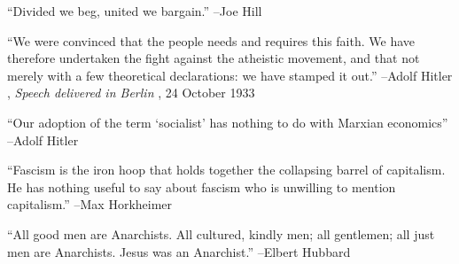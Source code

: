 \documentclass{article}%
\begin{document}
\linebreak%
\vspace{1mm}%
\begin{minipage}{\textwidth}%
\flushleft%
“Divided we beg, united we bargain.”%
\linebreak%
\vspace{1mm}%
–Joe Hill%
\linebreak%
\vspace{1mm}%
\end{minipage}%
\linebreak%
\vspace{1mm}%
\begin{minipage}{\textwidth}%
\flushleft%
“We were convinced that the people needs and requires this faith. We have therefore undertaken the fight against the atheistic movement, and that not merely with a few theoretical declarations: we have stamped it out.”%
\linebreak%
\vspace{1mm}%
–Adolf Hitler%
, \textit{Speech delivered in Berlin}%
, 24 October 1933%
\linebreak%
\vspace{1mm}%
\end{minipage}%
\linebreak%
\vspace{1mm}%
\begin{minipage}{\textwidth}%
\flushleft%
“Our adoption of the term ‘socialist’ has nothing to do with Marxian economics”%
\linebreak%
\vspace{1mm}%
–Adolf Hitler%
\linebreak%
\vspace{1mm}%
\end{minipage}%
\linebreak%
\vspace{1mm}%
\begin{minipage}{\textwidth}%
\flushleft%
“Fascism is the iron hoop that holds together the collapsing barrel of capitalism. He has nothing useful to say about fascism who is unwilling to mention capitalism.”%
\linebreak%
\vspace{1mm}%
–Max Horkheimer%
\linebreak%
\vspace{1mm}%
\end{minipage}%
\linebreak%
\vspace{1mm}%
\begin{minipage}{\textwidth}%
\flushleft%
“All good men are Anarchists. All cultured, kindly men; all gentlemen; all just men are Anarchists. Jesus was an Anarchist.”%
\linebreak%
\vspace{1mm}%
–Elbert Hubbard%
\linebreak%
\vspace{1mm}%
\end{minipage}%
\end{document}
